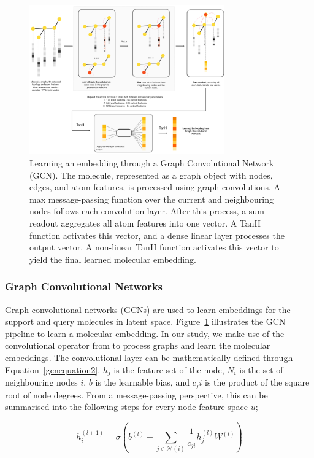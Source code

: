 \documentclass[journal=acscii,manuscript=article]{achemso}
\begin{document}
\begin{figure}
  \centering
  \includegraphics[width=0.75\textwidth]{img/DVGCNArchi.png}
  \caption{Learning an embedding through a Graph Convolutional Network (GCN). The molecule, represented as a graph object with nodes, edges, and atom features, is processed using graph convolutions. A max message-passing function over the current and neighbouring nodes follows each convolution layer. After this process, a sum readout aggregates all atom features into one vector. A TanH function activates this vector, and a dense linear layer processes the output vector. A non-linear TanH function activates this vector to yield the final learned molecular embedding.}
  \label{fig:dvgcnarchi}
\end{figure}

\subsubsection{Graph Convolutional Networks}

Graph convolutional networks (GCNs) are used to learn embeddings for the support and query molecules in latent space. Figure~\ref{fig:dvgcnarchi} illustrates the GCN pipeline to learn a molecular embedding. In our study, we make use of the convolutional operator from \citet{kipf2016semi} to process graphs and learn the molecular embeddings. The convolutional layer can be mathematically defined through Equation~\ref{gcnequation2}. $h_j$ is the feature set of the node, $N_i$ is the set of neighbouring nodes $i$, $b$ is the learnable bias, and $c_ji$ is the product of the square root of node degrees. From a message-passing perspective, this can be summarised into the following steps for every node feature space $u$;

\begin{equation}
\label{gcnequation2}
h_i^{(l+1)} = \sigma(b^{(l)} + \sum_{j\in\mathcal{N}(i)}\frac{1}{c_{ji}}h_j^{(l)}W^{(l)})
\end{equation}
\end{document}
